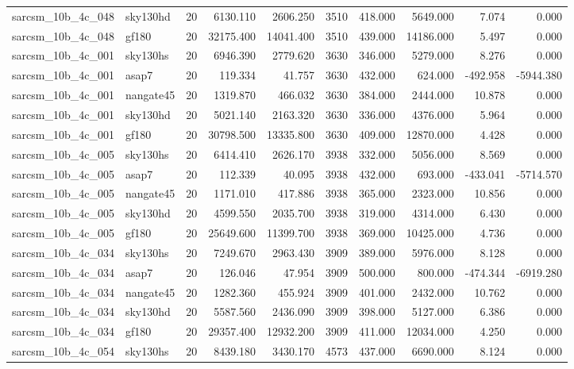 \documentclass{article}
\begin{document}
\begin{longtable}{llrrrrrrrr}
sarcsm\_10b\_4c\_048 & sky130hd & 20 & 6130.110 & 2606.250 & 3510 & 418.000 & 5649.000 & 7.074 & 0.000 \\
sarcsm\_10b\_4c\_048 & gf180 & 20 & 32175.400 & 14041.400 & 3510 & 439.000 & 14186.000 & 5.497 & 0.000 \\
sarcsm\_10b\_4c\_001 & sky130hs & 20 & 6946.390 & 2779.620 & 3630 & 346.000 & 5279.000 & 8.276 & 0.000 \\
sarcsm\_10b\_4c\_001 & asap7 & 20 & 119.334 & 41.757 & 3630 & 432.000 & 624.000 & -492.958 & -5944.380 \\
sarcsm\_10b\_4c\_001 & nangate45 & 20 & 1319.870 & 466.032 & 3630 & 384.000 & 2444.000 & 10.878 & 0.000 \\
sarcsm\_10b\_4c\_001 & sky130hd & 20 & 5021.140 & 2163.320 & 3630 & 336.000 & 4376.000 & 5.964 & 0.000 \\
sarcsm\_10b\_4c\_001 & gf180 & 20 & 30798.500 & 13335.800 & 3630 & 409.000 & 12870.000 & 4.428 & 0.000 \\
sarcsm\_10b\_4c\_005 & sky130hs & 20 & 6414.410 & 2626.170 & 3938 & 332.000 & 5056.000 & 8.569 & 0.000 \\
sarcsm\_10b\_4c\_005 & asap7 & 20 & 112.339 & 40.095 & 3938 & 432.000 & 693.000 & -433.041 & -5714.570 \\
sarcsm\_10b\_4c\_005 & nangate45 & 20 & 1171.010 & 417.886 & 3938 & 365.000 & 2323.000 & 10.856 & 0.000 \\
sarcsm\_10b\_4c\_005 & sky130hd & 20 & 4599.550 & 2035.700 & 3938 & 319.000 & 4314.000 & 6.430 & 0.000 \\
sarcsm\_10b\_4c\_005 & gf180 & 20 & 25649.600 & 11399.700 & 3938 & 369.000 & 10425.000 & 4.736 & 0.000 \\
sarcsm\_10b\_4c\_034 & sky130hs & 20 & 7249.670 & 2963.430 & 3909 & 389.000 & 5976.000 & 8.128 & 0.000 \\
sarcsm\_10b\_4c\_034 & asap7 & 20 & 126.046 & 47.954 & 3909 & 500.000 & 800.000 & -474.344 & -6919.280 \\
sarcsm\_10b\_4c\_034 & nangate45 & 20 & 1282.360 & 455.924 & 3909 & 401.000 & 2432.000 & 10.762 & 0.000 \\
sarcsm\_10b\_4c\_034 & sky130hd & 20 & 5587.560 & 2436.090 & 3909 & 398.000 & 5127.000 & 6.386 & 0.000 \\
sarcsm\_10b\_4c\_034 & gf180 & 20 & 29357.400 & 12932.200 & 3909 & 411.000 & 12034.000 & 4.250 & 0.000 \\
sarcsm\_10b\_4c\_054 & sky130hs & 20 & 8439.180 & 3430.170 & 4573 & 437.000 & 6690.000 & 8.124 & 0.000 \\

\end{longtable}
\end{document}
